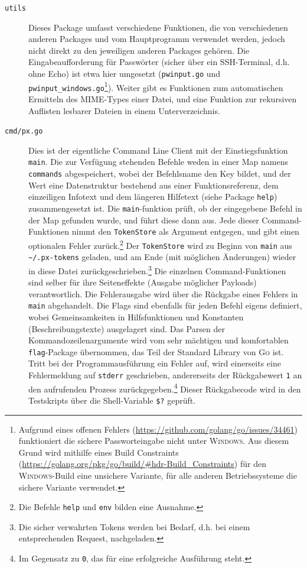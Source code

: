 \begin{description}
    \item[\texttt{utils}] Dieses Package umfasst verschiedene Funktionen, die von verschiedenen anderen Packages und vom Hauptprogramm verwendet werden, jedoch nicht direkt zu den jeweiligen anderen Packages gehören. Die Eingabeaufforderung für Passwörter (sicher über ein SSH-Terminal, d.h. ohne Echo) ist etwa hier umgesetzt (\texttt{pwinput.go} und \texttt{pwinput\_windows.go}\footnote{Aufgrund eines offenen Fehlers (\url{https://github.com/golang/go/issues/34461}) funktioniert die sichere Passworteingabe nicht unter \textsc{Windows}. Aus diesem Grund wird mithilfe eines Build Constraints (\url{https://golang.org/pkg/go/build/\#hdr-Build\_Constraints}) für den \textsc{Windows}-Build eine unsichere Variante, für alle anderen Betriebssysteme die sichere Variante verwendet.}). Weiter gibt es Funktionen zum automatischen Ermitteln des MIME-Types einer Datei, und eine Funktion zur rekursiven Auflisten lesbarer Dateien in einem Unterverzeichnis.
    \item[\texttt{cmd/px.go}] Dies ist der eigentliche Command Line Client mit der Einstiegsfunktion \texttt{main}. Die zur Verfügung stehenden Befehle weden in einer Map namens \texttt{commands} abgespeichert, wobei der Befehlsname den Key bildet, und der Wert eine Datenstruktur bestehend aus einer Funktionsreferenz, dem einzeiligen Infotext und dem längeren Hilfetext (siehe Package \texttt{help}) zusammengesetzt ist. Die \texttt{main}-funktion prüft, ob der eingegebene Befehl in der Map gefunden wurde, und führt diese dann aus. Jede dieser Command-Funktionen nimmt den \texttt{TokenStore} als Argument entgegen, und gibt einen optionalen Fehler zurück.\footnote{Die Befehle \texttt{help} und \texttt{env} bilden eine Ausnahme.} Der \texttt{TokenStore} wird zu Beginn von \texttt{main} aus \texttt{\~{}/.px-tokens} geladen, und am Ende (mit möglichen Änderungen) wieder in diese Datei zurückgeschrieben.\footnote{Die sicher verwahrten Tokens werden bei Bedarf, d.h. bei einem entsprechenden Request, nachgeladen.} Die einzelnen Command-Funktionen sind selber für ihre Seiteneffekte (Ausgabe möglicher Payloads) verantwortlich. Die Fehlerausgabe wird über die Rückgabe eines Fehlers in \texttt{main} abgehandelt. Die Flags sind ebenfalls für jeden Befehl eigens definiert, wobei Gemeinsamkeiten in Hilfsfunktionen und Konstanten (Beschreibungstexte) ausgelagert sind. Das Parsen der Kommandozeilenargumente wird vom sehr mächtigen und komfortablen \texttt{flag}-Package übernommen, das Teil der Standard Library von \textsc{Go} ist. Tritt bei der Programmausführung ein Fehler auf, wird einerseits eine Fehlermeldung auf \texttt{stderr} geschrieben, andererseits der Rückgabewert \texttt{1} an den aufrufenden Prozess zurückgegeben.\footnote{Im Gegensatz zu \texttt{0}, das für eine erfolgreiche Ausführung steht.} Dieser Rückgabecode wird in den Testskripts über die Shell-Variable \texttt{\$?} geprüft.
\end{description}

